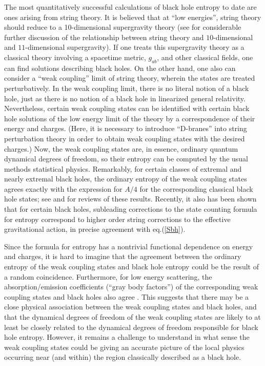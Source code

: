 The most quantitatively successful calculations of black hole entropy
to date are ones arising from string theory. It is believed that at
``low energies'', string theory should reduce to a 10-dimensional
supergravity theory (see \cite{m} for considerable further discussion
of the relationship between string theory and $10$-dimensional and
$11$-dimensional supergravity). If one treats this supergravity theory
as a classical theory involving a spacetime metric, $g_{ab}$, and
other classical fields, one can find solutions describing black
holes. On the other hand, one also can consider a ``weak coupling''
limit of string theory, wherein the states are treated perturbatively.
In the weak coupling limit, there is no literal notion of a black
hole, just as there is no notion of a black hole in linearized general
relativity. Nevertheless, certain weak coupling states can be
identified with certain black hole solutions of the low energy limit
of the theory by a correspondence of their energy and charges. (Here,
it is necessary to introduce ``D-branes'' into string perturbation
theory in order to obtain weak coupling states with the desired
charges.) Now, the weak coupling states are, in essence, ordinary
quantum dynamical degrees of freedom, so their entropy can be computed
by the usual methods statistical physics.  Remarkably, for certain
classes of extremal and nearly extremal black holes, the ordinary
entropy of the weak coupling states agrees exactly with the expression
for $A/4$ for the corresponding classical black hole states; see
\cite{ho} and \cite{peet} for reviews of these results. Recently, it
also has been shown \cite {cwm} that for certain black holes,
subleading corrections to the state counting formula for entropy
correspond to higher order string corrections to the effective
gravitational action, in precise agreement with eq.(\ref{Sbh}).

Since the formula for entropy has a nontrivial functional dependence
on energy and charges, it is hard to imagine that the agreement
between the ordinary entropy of the weak coupling states and black
hole entropy could be the result of a random coincidence. Furthermore,
for low energy scattering, the absorption/emission coefficients
(``gray body factors'') of the corresponding weak coupling states and
black holes also agree \cite{ms}. This suggests that there may be a
close physical association between the weak coupling states and black
holes, and that the dynamical degrees of freedom of the weak coupling
states are likely to at least be closely related to the dynamical
degrees of freedom responsible for black hole entropy. However, it
remains a challenge to understand in what sense the weak coupling
states could be giving an accurate picture of the local physics
occurring near (and within) the region classically described as a
black hole.

